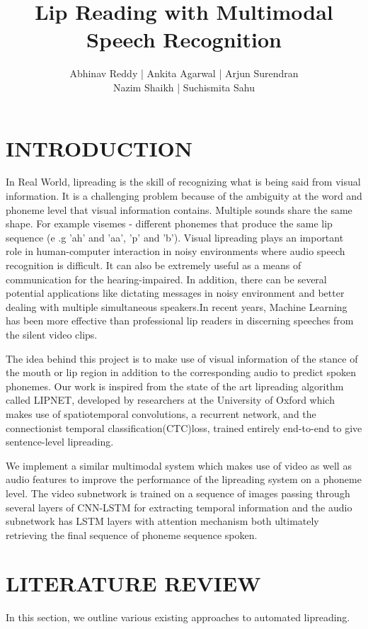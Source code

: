 \documentclass{article}
\title{Lip Reading with Multimodal Speech Recognition}
\author{Abhinav Reddy | Ankita Agarwal | Arjun Surendran \\ Nazim Shaikh | Suchismita Sahu}
\date{}
\begin{document}
\maketitle


\section{INTRODUCTION}
In Real World, lipreading is the skill of recognizing what is being said from visual information. It is a challenging problem because of the ambiguity at the word and phoneme level that visual information contains. Multiple sounds share the same shape. For example visemes - different phonemes that produce the same lip sequence  (e .g 'ah' and 'aa', 'p' and 'b').\cite{LipreadingInWild} Visual lipreading plays an important role in human-computer interaction in noisy environments where audio speech recognition is difficult. It can also be extremely useful as a means of communication for the hearing-impaired. In addition, there can be several potential applications like dictating messages in noisy environment and better dealing with multiple simultaneous speakers.In recent years, Machine Learning has been more effective than professional lip readers in discerning speeches from the silent video clips.\cite{MultimodalMlReview}

The idea behind this project is to make use of visual information of the stance of the mouth or lip region in addition to the corresponding audio to predict spoken phonemes\cite{MultimodalAVSR}. Our work is inspired from the state of the art lipreading algorithm called LIPNET\cite{LIPNET}, developed by researchers at the University of Oxford which makes use of spatiotemporal convolutions, a recurrent network, and the connectionist temporal classification(CTC)loss, trained entirely end-to-end to give sentence-level lipreading.

We implement a similar multimodal system\cite{gpm12} which makes use of video as well as audio features to improve the performance of the lipreading system on a phoneme level. The video sub\-network is trained on a sequence of images passing through several layers of CNN-LSTM \cite{LipreadingCNN} for extracting temporal information\cite{garg2016lip} and the audio sub\-network has LSTM layers with attention mechanism \cite{Attention_Medium} both ultimately retrieving the final sequence of phoneme sequence spoken.

\section{LITERATURE REVIEW}
In this section, we outline various existing approaches to automated lipreading.
\end{document}

